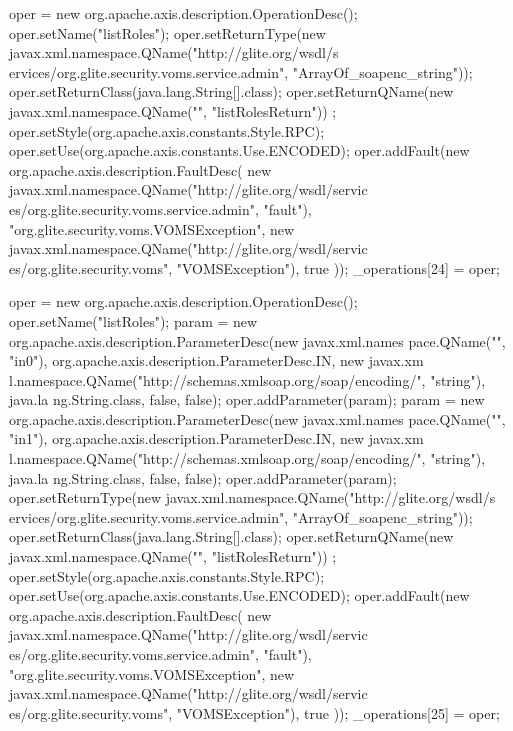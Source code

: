 \begin{DoxyCode}
{        oper = new org.apache.axis.description.OperationDesc();
        oper.setName("listRoles");
        oper.setReturnType(new javax.xml.namespace.QName("http://glite.org/wsdl/s
      ervices/org.glite.security.voms.service.admin", "ArrayOf_soapenc_string"));
        oper.setReturnClass(java.lang.String[].class);
        oper.setReturnQName(new javax.xml.namespace.QName("", "listRolesReturn"))
      ;
        oper.setStyle(org.apache.axis.constants.Style.RPC);
        oper.setUse(org.apache.axis.constants.Use.ENCODED);
        oper.addFault(new org.apache.axis.description.FaultDesc(
                      new javax.xml.namespace.QName("http://glite.org/wsdl/servic
      es/org.glite.security.voms.service.admin", "fault"),
                      "org.glite.security.voms.VOMSException",
                      new javax.xml.namespace.QName("http://glite.org/wsdl/servic
      es/org.glite.security.voms", "VOMSException"), 
                      true
                     ));
        _operations[24] = oper;

        oper = new org.apache.axis.description.OperationDesc();
        oper.setName("listRoles");
        param = new org.apache.axis.description.ParameterDesc(new javax.xml.names
      pace.QName("", "in0"), org.apache.axis.description.ParameterDesc.IN, new javax.xm
      l.namespace.QName("http://schemas.xmlsoap.org/soap/encoding/", "string"), java.la
      ng.String.class, false, false);
        oper.addParameter(param);
        param = new org.apache.axis.description.ParameterDesc(new javax.xml.names
      pace.QName("", "in1"), org.apache.axis.description.ParameterDesc.IN, new javax.xm
      l.namespace.QName("http://schemas.xmlsoap.org/soap/encoding/", "string"), java.la
      ng.String.class, false, false);
        oper.addParameter(param);
        oper.setReturnType(new javax.xml.namespace.QName("http://glite.org/wsdl/s
      ervices/org.glite.security.voms.service.admin", "ArrayOf_soapenc_string"));
        oper.setReturnClass(java.lang.String[].class);
        oper.setReturnQName(new javax.xml.namespace.QName("", "listRolesReturn"))
      ;
        oper.setStyle(org.apache.axis.constants.Style.RPC);
        oper.setUse(org.apache.axis.constants.Use.ENCODED);
        oper.addFault(new org.apache.axis.description.FaultDesc(
                      new javax.xml.namespace.QName("http://glite.org/wsdl/servic
      es/org.glite.security.voms.service.admin", "fault"),
                      "org.glite.security.voms.VOMSException",
                      new javax.xml.namespace.QName("http://glite.org/wsdl/servic
      es/org.glite.security.voms", "VOMSException"), 
                      true
                     ));
        _operations[25] = oper;

}
\end{DoxyCode}

